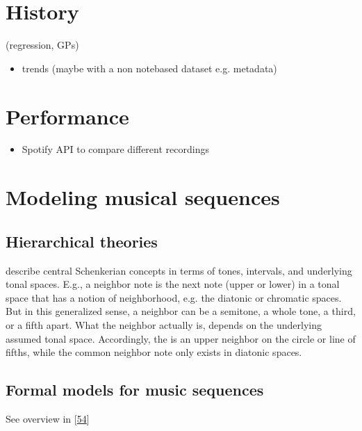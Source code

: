 \documentclass[letterpaper,10pt,english]{sphinxmanual}
\begin{document}
\section{History}
\label{\detokenize{6_advanced:history}}
\sphinxAtStartPar
(regression, GPs)
\begin{itemize}
\item {} 
\sphinxAtStartPar
trends (maybe with a non note\sphinxhyphen{}based dataset e.g. metadata)

\end{itemize}


\section{Performance}
\label{\detokenize{6_advanced:performance}}\begin{itemize}
\item {} 
\sphinxAtStartPar
Spotify API to compare different recordings

\end{itemize}


\section{Modeling musical sequences}
\label{\detokenize{6_advanced:modeling-musical-sequences}}

\subsection{Hierarchical theories}
\label{\detokenize{6_advanced:hierarchical-theories}}
\sphinxAtStartPar
describe central Schenkerian concepts in terms
of tones, intervals, and underlying tonal spaces.
E.g., a neighbor note is the next note (upper or lower)
in a tonal space that has a notion of neighborhood, e.g.
the diatonic or chromatic spaces. But in this generalized sense,
a neighbor can be a semitone, a whole tone, a third, or a fifth
apart. What the neighbor actually is, depends on the underlying
assumed tonal space. Accordingly, the  is an upper
neighbor on the circle or line of fifths, while the common neighbor note
only exists in diatonic spaces.


\subsection{Formal models for music sequences}
\label{\detokenize{6_advanced:formal-models-for-music-sequences}}
\sphinxAtStartPar
See overview in {[}\hyperlink{cite.8_bibliography:id17}{54}{]}
\end{document}
